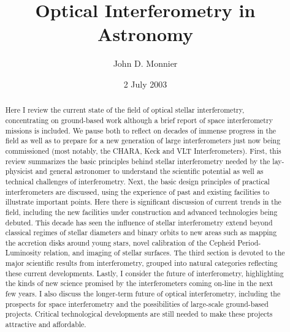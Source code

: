 \documentclass[12pt]{article}
\begin{document}
\title{Optical Interferometry in Astronomy}

\author{John D. Monnier}


\date{2 July 2003}
\maketitle

\begin{abstract}
  Here I review the current state of the field of optical stellar
  interferometry, concentrating on ground-based work although a brief
  report of space interferometry missions is included.  We pause both
  to reflect on decades of immense progress in the field as well as to
  prepare for a new generation of large interferometers just now being
  commissioned (most notably, the CHARA, Keck and VLT
  Interferometers).  First, this review summarizes the basic
  principles behind stellar interferometry needed by the lay-physicist
  and general astronomer to understand the scientific potential as
  well as technical challenges of interferometry.  Next, the basic
  design principles of practical interferometers are discussed, using
  the experience of past and existing facilities to illustrate
  important points.  Here there is significant discussion of current trends
  in the field, including the new facilities under construction and
  advanced technologies being debuted.  This decade has seen the
  influence of stellar interferometry extend beyond classical regimes
  of stellar diameters and binary orbits to new areas such as mapping
  the accretion disks around young stars, novel calibration of the
  Cepheid Period-Luminosity relation, and imaging of stellar surfaces.
  The third section is devoted to the major scientific results from
  interferometry, grouped into natural categories reflecting these
  current developments.  Lastly, I consider the future of
  interferometry, highlighting the kinds of new science promised by
  the interferometers coming on-line in the next few years.  I also
  discuss the longer-term future of optical interferometry, including
  the prospects for space interferometry and the possibilities of
  large-scale ground-based projects.  Critical technological
  developments are still needed to make these projects attractive and
  affordable.

 \end{abstract}
\end{document}
